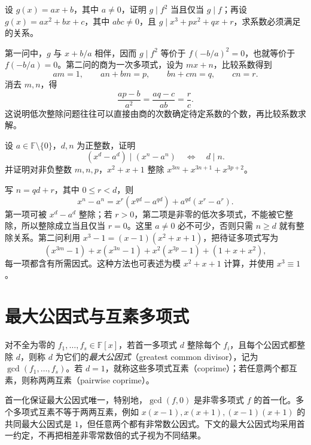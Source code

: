 \begin{example}
\label{ex:poly-divisibility-basic}
设 $g(x)=ax+b$，其中 $a\ne0$，证明 $g\mid f^2$ 当且仅当 $g\mid f$；再设 $g(x)=ax^2+bx+c$，其中 $abc\ne0$，且 $g\mid x^3+px^2+qx+r$，求系数必须满足的关系。
\end{example}
\begin{solve}
第一问中，$g$ 与 $x+b/a$ 相伴，因而 $g\mid f^2$ 等价于 $f(-b/a)^2=0$，也就等价于 $f(-b/a)=0$。第二问的商为一次多项式，设为 $mx+n$，比较系数得到
\[
    am=1,\qquad an+bm=p,\qquad bn+cm=q,\qquad cn=r.
\]
消去 $m,n$，得
\[
    \frac{ap-b}{a^2}=\frac{aq-c}{ab}=\frac rc.
\]
这说明低次整除问题往往可以直接由商的次数确定待定系数的个数，再比较系数求解。
\end{solve}

\begin{example}
\label{ex:poly-power-divisibility}
设 $a\in\mathbb F\setminus\{0\}$，$d,n$ 为正整数，证明
\[
    (x^d-a^d)\mid(x^n-a^n)\quad\Longleftrightarrow\quad d\mid n.
\]
并证明对非负整数 $m,n,p$，$x^2+x+1$ 整除 $x^{3m}+x^{3n+1}+x^{3p+2}$。
\end{example}
\begin{solve}
写 $n=qd+r$，其中 $0\leq r<d$，则
\[
    x^n-a^n=x^r(x^{qd}-a^{qd})+a^{qd}(x^r-a^r).
\]
第一项可被 $x^d-a^d$ 整除；若 $r>0$，第二项是非零的低次多项式，不能被它整除，所以整除成立当且仅当 $r=0$。这里 $a\ne0$ 必不可少，否则只需 $n\geq d$ 就有整除关系。第二问利用 $x^3-1=(x-1)(x^2+x+1)$，把待证多项式写为
\[
    (x^{3m}-1)+x(x^{3n}-1)+x^2(x^{3p}-1)+(1+x+x^2),
\]
每一项都含有所需因式。这种方法也可表述为模 $x^2+x+1$ 计算，并使用 $x^3\equiv1$。
\end{solve}

\section{最大公因式与互素多项式}
\label{sec:poly-gcd}

\begin{definition}
\label{def:poly-gcd}
对不全为零的 $f_1,\ldots,f_s\in\mathbb F[x]$，若首一多项式 $d$ 整除每个 $f_i$，且每个公因式都整除 $d$，则称 $d$ 为它们的\emph{最大公因式}（greatest common divisor），记为 $\gcd(f_1,\ldots,f_s)$。若 $d=1$，就称这些多项式互素（coprime）；若任意两个都互素，则称两两互素（pairwise coprime）。
\end{definition}

首一化保证最大公因式唯一，特别地，$\gcd(f,0)$ 是非零多项式 $f$ 的首一化。多个多项式互素不等于两两互素，例如 $x(x-1),x(x+1),(x-1)(x+1)$ 的共同最大公因式是 $1$，但任意两个都有非常数公因式。下文的最大公因式均采用首一约定，不再把相差非零常数倍的式子视为不同结果。

